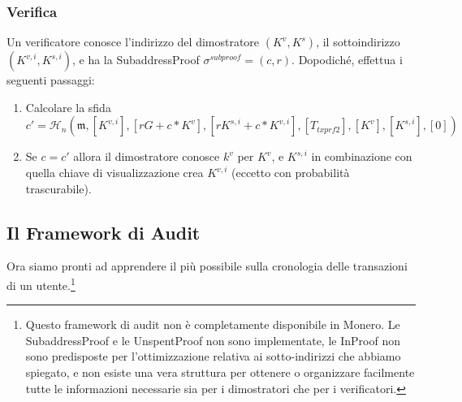 \subsubsection*{Verifica}

Un verificatore conosce l'indirizzo del dimostratore $(K^v, K^s)$, il sottoindirizzo $(K^{v,i}, K^{s,i})$, e ha la SubaddressProof $\sigma^{subproof} = (c,r)$. Dopodiché, effettua i seguenti passaggi:

\begin{enumerate}
    \item Calcolare la sfida\vspace{.175cm}
	\[c' = \mathcal{H}_n(\mathfrak{m},[K^{v,i}], [r G + c*K^v], [r K^{s,i} + c*K^{v,i}], [T_{txprf2}], [K^v], [K^{s,i}], [0])\]
    \item Se $c = c'$ allora il dimostratore conosce $k^v$ per $K^v$, e $K^{s,i}$ in combinazione con quella chiave di visualizzazione crea $K^{v,i}$ (eccetto con probabilità trascurabile).
\end{enumerate}{}


\subsection{Il Framework di Audit}
\label{subsec:audit-framework}

Ora siamo pronti ad apprendere il più possibile sulla cronologia delle transazioni di un utente.\footnote{Questo framework di audit non è completamente disponibile in Monero. Le SubaddressProof e le UnspentProof non sono implementate, le InProof non sono predisposte per l'ottimizzazione relativa ai sotto-indirizzi che abbiamo spiegato, e non esiste una vera struttura per ottenere o organizzare facilmente tutte le informazioni necessarie sia per i dimostratori che per i verificatori.}


